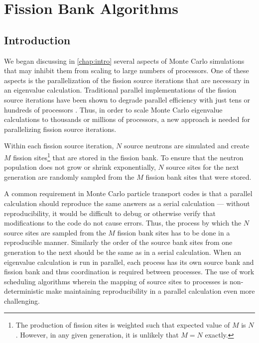 \chapter{Fission Bank Algorithms}
\label{chap:fission-bank}

\section{Introduction}

We began discussing in \autoref{chap:intro} several aspects of Monte Carlo
simulations that may inhibit them from scaling to large numbers of
processors. One of these aspects is the parallelization of the fission source
iterations that are necessary in an eigenvalue calculation. Traditional parallel
implementations of the fission source iterations have been shown to degrade
parallel efficiency with just tens or hundreds of processors
\cite{physor-hoogenboom-2012}. Thus, in order to scale Monte Carlo eigenvalue
calculations to thousands or millions of processors, a new approach is needed
for parallelizing fission source iterations.

Within each fission source iteration, $N$ source neutrons are simulated and
create $M$ fission sites\footnote{The production of fission sites is weighted
  such that expected value of $M$ is $N$. However, in any given generation, it
  is unlikely that $M=N$ exactly.} that are stored in the fission bank. To
ensure that the neutron population does not grow or shrink exponentially, $N$
source sites for the next generation are randomly sampled from the $M$ fission
bank sites that were stored.

A common requirement in Monte Carlo particle transport codes is that a parallel
calculation should reproduce the same answers as a serial calculation ---
without reproducibility, it would be difficult to debug or otherwise verify that
modifications to the code do not cause errors. Thus, the process by which the
$N$ source sites are sampled from the $M$ fission bank sites has to be done in a
reproducible manner. Similarly the order of the source bank sites from one
generation to the next should be the same as in a serial calculation. When an
eigenvalue calculation is run in parallel, each process has its own source bank
and fission bank and thus coordination is required between processes. The use of
work scheduling algorithms wherein the mapping of source sites to processes is
non-deterministic make maintaining reproducibility in a parallel calculation
even more challenging.

